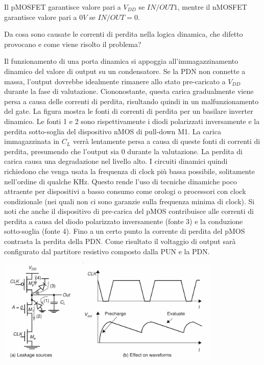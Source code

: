 \documentclass[answers,a4paper,12pt]{exam}
\begin{document}
\begin{questions}
\begin{solutionorbox}[5cm]
Il pMOSFET garantisce valore pari a $V_{DD}$ se $IN/OUT 1$, mentre il nMOSFET garantisce valore pari a $0 V$ se $IN/OUT = 0$.
\end{solutionorbox}
\question Da cosa sono causate le correnti di perdita nella logica dinamica, che difetto provocano e come viene risolto il problema?
\begin{solutionorbox}[5cm]
    Il funzionamento di una porta dinamica si appoggia all'immagazzinamento dinamico del valore di output su un condensatore.
    Se la PDN non connette a massa, l'output dovrebbe idealmente rimanere allo stato pre-caricato a $V_{DD}$ durante la fase di valutazione.
    Ciononostante, questa carica gradualmente viene persa a causa delle correnti di perdita, risultando quindi in un malfunzionamento del gate.
    La figura mostra le fonti di correnti di perdita per un basilare inverter dinamico.
    Le fonti 1 e 2 sono rispettivamente i diodi polarizzati inversamente e la perdita sotto-soglia del dispositivo nMOS di pull-down M1.
    La carica immagazzinata in $C_L$ verrà lentamente persa a causa di queste fonti di correnti di perdita, presumendo che l'output sia 0 durante la valutazione.
    La perdita di carica causa una degradazione nel livello alto. 
    I circuiti dinamici quindi richiedono che venga usata la frequenza di clock più bassa possibile, solitamente nell'ordine di qualche KHz.
    Questo rende l'uso di tecniche dinamiche poco attraente per dispositivi a basso consumo come orologi o processori con clock condizionale (nei quali non ci sono garanzie sulla frequenza minima di clock).
    Si noti che anche il dispositivo di pre-carica del pMOS contribuisce alle correnti di perdita a causa del diodo polarizzato inversamente (fonte 3) e la conduzione sotto-soglia (fonte 4).
    Fino a un certo punto la corrente di perdita del pMOS contrasta la perdita della PDN.
    Come risultato il voltaggio di output sarà configurato dal partitore resistivo composto dalla PUN e la PDN.

{\centering

\includegraphics[width=0.8\textwidth]{CorrentiPerdita.png}

}
\end{solutionorbox}
\end{questions}
\end{document}

